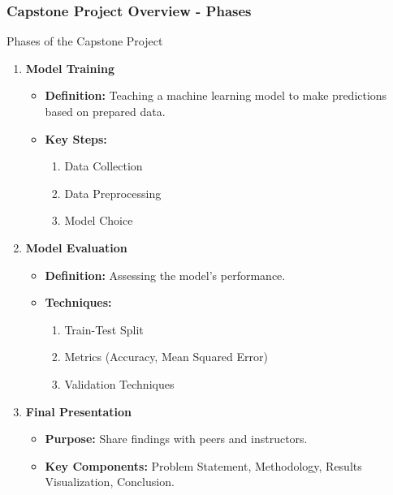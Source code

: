 \documentclass[aspectratio=169]{beamer}
\begin{document}
\begin{frame}[fragile]
  \frametitle{Capstone Project Overview - Phases}
  
  \begin{block}{Phases of the Capstone Project}
    \begin{enumerate}
        \item \textbf{Model Training}
        \begin{itemize}
            \item \textbf{Definition:} Teaching a machine learning model to make predictions based on prepared data.
            \item \textbf{Key Steps:}
            \begin{enumerate}
                \item Data Collection
                \item Data Preprocessing
                \item Model Choice
            \end{enumerate}
        \end{itemize}
        
        \item \textbf{Model Evaluation}
        \begin{itemize}
            \item \textbf{Definition:} Assessing the model's performance.
            \item \textbf{Techniques:}
            \begin{enumerate}
                \item Train-Test Split
                \item Metrics (Accuracy, Mean Squared Error)
                \item Validation Techniques
            \end{enumerate}
        \end{itemize}
        
        \item \textbf{Final Presentation}
        \begin{itemize}
            \item \textbf{Purpose:} Share findings with peers and instructors.
            \item \textbf{Key Components:} Problem Statement, Methodology, Results Visualization, Conclusion.
        \end{itemize}
    \end{enumerate}
  \end{block}
\end{frame}
\end{document}
